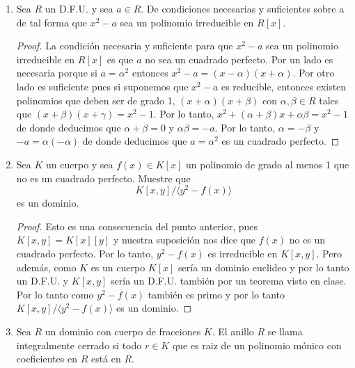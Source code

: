\documentclass[letter,twoside,12pt]{article}
\begin{document}
\begin{enumerate}
\begin{enumerate}
\begin{proof}
Obsérvese que $p(x)=(x-\alpha_i)q(x)$ donde $ q(x) $ no es divisible por $ (x-\alpha_i) $.
Si $ p'(x) $ fuera divisible por $ (x-\alpha_i) $ entonces $ q(x) = p'(x)-(x-\alpha_i)q'(x) $ sería divisible por $ (x-\alpha_i) $ lo cual es una contradicción. Por lo tanto $ p'(x) $ no es divisible por $ x- \alpha_i $. Esto concluye la demostración.
\end{proof}
\end{enumerate}
\item Sea $R$ un D.F.U. y sea $ a \in R $. De condiciones necesarias y suficientes sobre a de tal forma que $x^2-a$ sea
un polinomio irreducible en $ R[x] $.
\begin{proof}
La condición necesaria y suficiente para que $ x^2-a $ sea un polinomio irreducible en $ R[x] $ es que $ a $ no sea un cuadrado perfecto. Por un lado es necesaria porque si $ a=\alpha^2 $ entonces $ x^2-a =(x-\alpha)(x+\alpha)$. Por otro lado es suficiente pues si suponemos que $ x^2-a $ es reducible, entonces existen polinomios que deben ser de grado 1, $ (x+\alpha)(x+\beta) $ con $ \alpha,\beta \in R $ tales que $ (x+\beta)(x+\gamma) = x^2-1 $. Por lo tanto, $ x^2+(\alpha+\beta)x+\alpha\beta =x^2-1$ de donde deducimos que $ \alpha+\beta = 0  $ y $ \alpha\beta = -a$. Por lo tanto, $ \alpha = - \beta $ y $-a = \alpha(-\alpha)$ de donde deducimos que $ a = \alpha^2 $ es un cuadrado perfecto.

\end{proof}
\item Sea $ K $ un cuerpo y sea $ f(x) \in K[x] $ un polinomio de grado al menos 1 que no es un cuadrado perfecto.
Muestre que
\begin{equation}
K[x,y]/\langle y^2-f(x)\rangle\nonumber
\end{equation}
es un dominio.

\begin{proof}
Esto es una consecuencia del punto anterior, pues $ K[x,y]=K[x][y] $ y nuestra suposición nos dice que $ f(x) $ no es un cuadrado perfecto. Por lo tanto, $ y^2 -f(x)$ es irreducible en $ K[x,y] $. Pero además, como $ K $ es un cuerpo $ K[x] $ sería un dominio euclideo y por lo tanto un D.F.U. y $ K[x,y] $ sería un D.F.U. también por un teorema visto en clase. Por lo tanto como $ y^2 -f(x)$ también es primo y por lo tanto $ K[x,y]/\langle y^2-f(x)\rangle\nonumber $ es un dominio.
\end{proof}

\item Sea $ R $ un dominio con cuerpo de fracciones $ K $. El anillo $ R $ se llama integralmente cerrado si todo $ r \in K
$ que es raiz de un polinomio mónico con coeficientes en $ R $ está en $ R $.


\end{enumerate}
\end{document}
